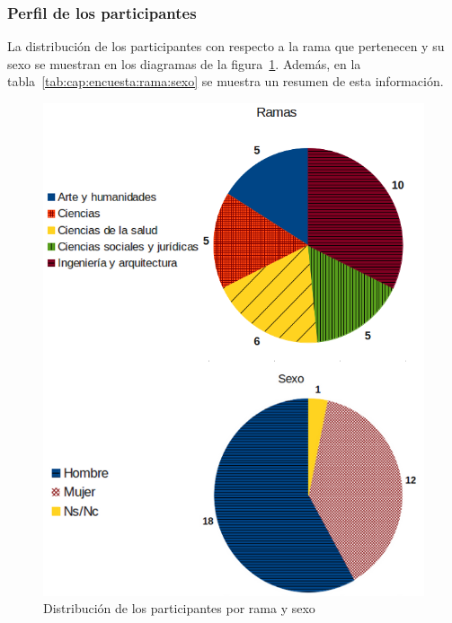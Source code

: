 \subsubsection*{Perfil de los participantes}

La distribución de los participantes con respecto a la rama que pertenecen y su sexo se muestran en los diagramas de la figura~\ref{fig:cap:encuesta:ramaysexo}. Además, en la tabla~\ref{tab:cap:encuesta:rama:sexo} se muestra un resumen de esta información.


\begin{figure}
  \begin{center}
    \includegraphics[scale=0.4]{JornadasPoblacionVertical.png}
  \end{center}
  \caption{Distribución de los participantes por rama y sexo}
  \label{fig:cap:encuesta:ramaysexo}
\end{figure}


